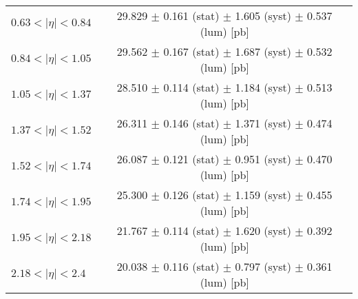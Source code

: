 \begin{tabular}{lc}
$0.63 < |\eta| <0.84$          & 29.829 $\pm$ 0.161 (stat) $\pm$ 1.605 (syst) $\pm$ 0.537 (lum) [pb]  \\
$0.84 < |\eta| <1.05$          & 29.562 $\pm$ 0.167 (stat) $\pm$ 1.687 (syst) $\pm$ 0.532 (lum) [pb]  \\
$1.05 < |\eta| <1.37$          & 28.510 $\pm$ 0.114 (stat) $\pm$ 1.184 (syst) $\pm$ 0.513 (lum) [pb]  \\
$1.37 < |\eta| <1.52$          & 26.311 $\pm$ 0.146 (stat) $\pm$ 1.371 (syst) $\pm$ 0.474 (lum) [pb]  \\
$1.52 < |\eta| <1.74$          & 26.087 $\pm$ 0.121 (stat) $\pm$ 0.951 (syst) $\pm$ 0.470 (lum) [pb]  \\
$1.74 < |\eta| <1.95$          & 25.300 $\pm$ 0.126 (stat) $\pm$ 1.159 (syst) $\pm$ 0.455 (lum) [pb]  \\
$1.95 < |\eta| <2.18$          & 21.767 $\pm$ 0.114 (stat) $\pm$ 1.620 (syst) $\pm$ 0.392 (lum) [pb]  \\
$2.18 < |\eta| <2.4$           & 20.038 $\pm$ 0.116 (stat) $\pm$ 0.797 (syst) $\pm$ 0.361 (lum) [pb]  \\
\hline
\end{tabular}
